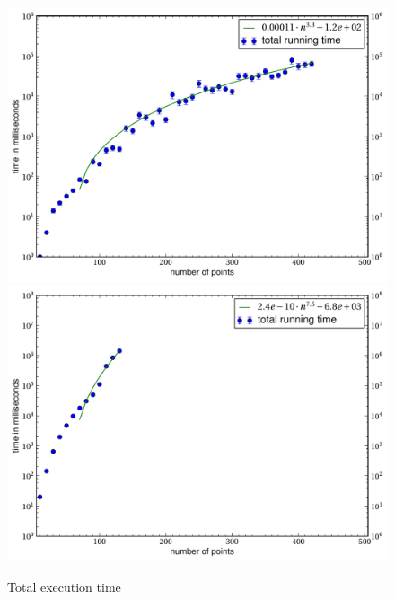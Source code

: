 \begin{figure}[ht]
  \centering
  \includegraphics[width=\linewidth,height=\textheight,keepaspectratio]{results/time_total.pdf}
  \includegraphics[width=\linewidth,height=\textheight,keepaspectratio]{results/complete_sat/time_total.pdf}
  \caption{\label{fig:time_total}Total execution time}
\end{figure}


